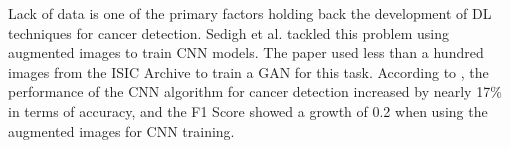 \documentclass[12pt]{diazessay}
\begin{document}
    Lack of data is one of the primary factors holding back the development of DL techniques for cancer detection. Sedigh et al. \cite{Sedigh2019-ld} tackled this problem using augmented images to train CNN models. The paper used less than a hundred images from the ISIC Archive to train a GAN for this task. According to \cite{Sedigh2019-ld}, the performance of the CNN algorithm for cancer detection increased by nearly 17\% in terms of accuracy, and the F1 Score showed a growth of 0.2 when using the augmented images for CNN training.


    \begin{table}[H]
      \begin{center}
\end{center}
\end{table}
\end{document}
